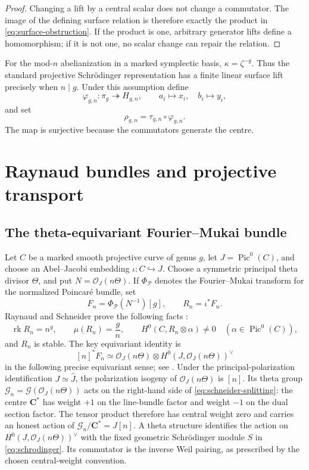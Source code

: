 \documentclass[11pt,reqno]{amsart}
\numberwithin{equation}{section}
\theoremstyle{remark}
\DeclareMathOperator{\Pic}{Pic}
\DeclareMathOperator{\rk}{rk}
\newcommand{\cO}{\mathcal O}
\newcommand{\cG}{\mathcal G}
\newcommand{\bC}{\mathbf C}
\begin{document}
\begin{proof}
Changing a lift by a central scalar does not change a commutator.  The
image of the defining surface relation is therefore exactly the product
in \eqref{eq:surface-obstruction}.  If the product is one, arbitrary
generator lifts define a homomorphism; if it is not one, no scalar
change can repair the relation.
\end{proof}

For the mod-\(n\) abelianization in a marked symplectic basis,
\(\kappa=\zeta^{-g}\).  Thus the standard projective Schr\"odinger
representation has a finite linear surface lift precisely when
\(n\mid g\).  Under this assumption define
\[
 \varphi_{g,n}\colon\pi_g\twoheadrightarrow H_{g,n},
 \qquad a_i\longmapsto x_i,\quad b_i\longmapsto y_i,
\tag{2.20}\label{eq:surface-heis-map}
\]
and set
\[
\rho_{g,n}=\tau_{g,n}\circ\varphi_{g,n}.
\tag{2.21}\label{eq:rho-definition}
\]
The map is surjective because the commutators generate the centre.

\section{Raynaud bundles and projective transport}

\subsection{The theta-equivariant Fourier--Mukai bundle}

Let \(C\) be a marked smooth projective curve of genus \(g\), let
\(J=\Pic^0(C)\), and choose an Abel--Jacobi embedding
\(\iota\colon C\hookrightarrow J\).  Choose a symmetric principal theta
divisor \(\Theta\), and put \(N=\cO_J(n\Theta)\).  If
\(\Phi_{\mathcal P}\) denotes the Fourier--Mukai transform for the
normalized Poincar\'e bundle, set
\[
 F_n=\Phi_{\mathcal P}(N^{-1})[g],\qquad R_n=\iota^*F_n.
\tag{3.1}\label{eq:raynaud-definition}
\]
Raynaud and Schneider prove the following facts
\cite{Raynaud,Schneider}:
\[
 \rk R_n=n^g,\qquad \mu(R_n)=\frac gn,\qquad
 H^0(C,R_n\otimes\alpha)\neq0
 \quad(\alpha\in\Pic^0(C)),
\tag{3.2}\label{eq:raynaud-support}
\]
and \(R_n\) is stable.  The key equivariant identity is
\[
 [n]^*F_n\simeq
 \cO_J(n\Theta)\otimes
 H^0(J,\cO_J(n\Theta))^\vee
\tag{3.3}\label{eq:schneider-splitting}
\]
in the following precise equivariant sense; see
\cite[Proposition 2.1(3)]{Schneider}.  Under the principal-polarization
identification \(J\simeq\widehat J\), the polarization isogeny of
\(\cO_J(n\Theta)\) is \([n]\).  Its theta group
\(\cG_n=\cG(\cO_J(n\Theta))\) acts on the right-hand side of
\eqref{eq:schneider-splitting}: the centre \(\bC^*\) has weight \(+1\)
on the line-bundle factor and weight \(-1\) on the dual section factor.
The tensor product therefore has central weight zero and carries an
honest action of \(\cG_n/\bC^*=J[n]\).  A theta structure identifies
the action on \(H^0(J,\cO_J(n\Theta))^\vee\) with the fixed geometric
Schr\"odinger module \(S\) in \eqref{eq:schrodinger}.  Its commutator is
the inverse Weil pairing, as prescribed by the chosen central-weight
convention.
\end{document}
